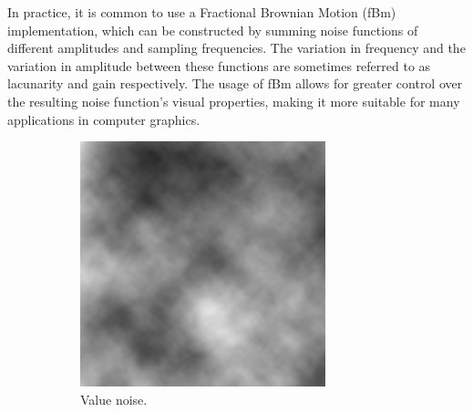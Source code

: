In practice, it is common to use a Fractional Brownian Motion (fBm) implementation, which can be constructed by summing noise functions of different amplitudes and sampling frequencies.
The variation in frequency and the variation in amplitude between these functions are sometimes referred to as lacunarity and gain respectively.
The usage of fBm allows for greater control over the resulting noise function's visual properties, making it more suitable for many applications in computer graphics.

\begin{figure}[h!]
  \centering
  \begin{subfigure}[b]{0.30\textwidth}
    \includegraphics[width=\textwidth]{figure/value_noise.png}
    \caption{Value noise. \cite{value_noise_img}}
  \end{subfigure}
  \quad
  \quad
  \quad
  \begin{subfigure}[b]{0.30\textwidth}

\end{subfigure}
\end{figure}
